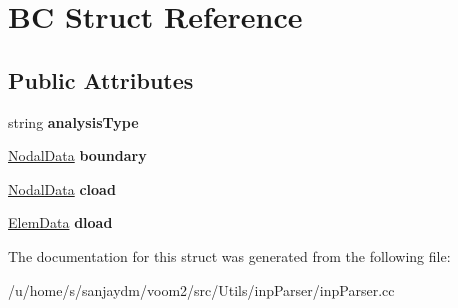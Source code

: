 \hypertarget{struct_b_c}{
\section{BC Struct Reference}
\label{struct_b_c}
}
\subsection*{Public Attributes}
\begin{DoxyCompactItemize}
\item 
\hypertarget{struct_b_c_acbbbb6459947520c51717c07077304a4}{
string {\bfseries analysisType}}
\label{struct_b_c_acbbbb6459947520c51717c07077304a4}

\item 
\hypertarget{struct_b_c_ad64bd2bf5093eff338b11e458d302f50}{
\hyperlink{struct_nodal_data}{NodalData} {\bfseries boundary}}
\label{struct_b_c_ad64bd2bf5093eff338b11e458d302f50}

\item 
\hypertarget{struct_b_c_a8cc98acf91a7d47b4903c5531e52439e}{
\hyperlink{struct_nodal_data}{NodalData} {\bfseries cload}}
\label{struct_b_c_a8cc98acf91a7d47b4903c5531e52439e}

\item 
\hypertarget{struct_b_c_aa24ff506821f8d4fe49ab1d148a88ace}{
\hyperlink{struct_elem_data}{ElemData} {\bfseries dload}}
\label{struct_b_c_aa24ff506821f8d4fe49ab1d148a88ace}

\end{DoxyCompactItemize}


The documentation for this struct was generated from the following file:\begin{DoxyCompactItemize}
\item 
/u/home/s/sanjaydm/voom2/src/Utils/inpParser/inpParser.cc\end{DoxyCompactItemize}
